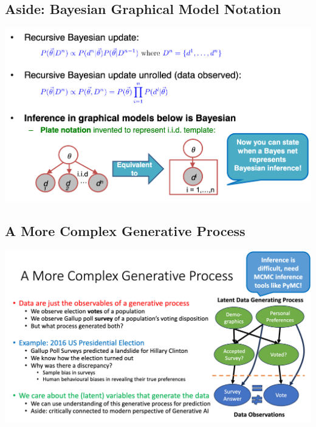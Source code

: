 \documentclass[11pt]{article}
\theoremstyle{definition}
\begin{document}
\subsection{Aside: Bayesian Graphical Model Notation}
\includegraphics[width=\textwidth]{11.png}

\subsection{A More Complex Generative Process}
\includegraphics[width=\textwidth]{12.png}
\end{document}
